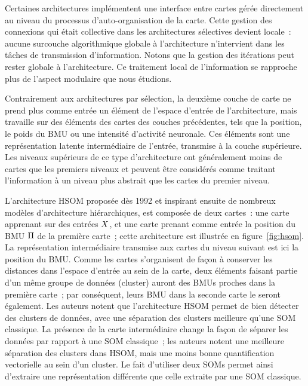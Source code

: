 \documentclass[../main]{subfiles}
\begin{document}
Certaines architectures implémentent une interface entre cartes gérée directement au niveau du processus d'auto-organisation de la carte.
Cette gestion des connexions qui était collective dans les architectures sélectives devient locale~: aucune surcouche algorithmique globale à l'architecture n'intervient dans les tâches de transmission d'information. Notons que la gestion des itérations peut rester globale à l'architecture.
Ce traitement local de l'information se rapproche plus de l'aspect modulaire que nous étudions.

Contrairement aux architectures par sélection, la deuxième couche de carte ne prend plus comme entrée un élément de l'espace d'entrée de l'architecture, mais travaille sur des éléments des cartes des couches précédentes, tels que la position, le poids du BMU ou une intensité d'activité neuronale. 
Ces éléments sont une représentation latente intermédiaire de l'entrée, transmise à la couche supérieure. Les niveaux supérieurs de ce type d'architecture ont généralement moins de cartes que les premiers niveaux et peuvent être considérés comme traitant l'information à un niveau plus abstrait que les cartes du premier niveau.


L'architecture  HSOM \cite{lampinen_clustering_1992} proposée dès 1992 et inspirant ensuite de nombreux modèles d'architecture hiérarchiques, est composée de deux cartes~: une carte apprenant sur des entrées $X$, et une carte prenant comme entrée la position du BMU $\Pi$ de la première carte~; cette architecture est illustrée en figure~\ref{fig:hsom}. 
La représentation intermédiaire transmise aux cartes du niveau suivant est ici la position du BMU.
Comme les cartes s'organisent de façon à conserver les distances dans l'espace d'entrée au sein de la carte, deux éléments faisant partie d'un même groupe de données (cluster) auront des BMUs proches dans la première carte~; par conséquent, leurs BMU dans la seconde carte le seront également. 
Les auteurs notent que l'architecture HSOM permet de bien détecter des clusters de données, avec une séparation des clusters meilleure qu'une SOM classique.
La présence de la carte intermédiaire change la façon de séparer les données par rapport à une SOM classique~; les auteurs notent une meilleure séparation des clusters dans HSOM, mais une moins bonne quantification vectorielle au sein d'un cluster. Le fait d'utiliser deux SOMs permet ainsi d'extraire une représentation différente que celle extraite par une SOM classique.
\end{document}
